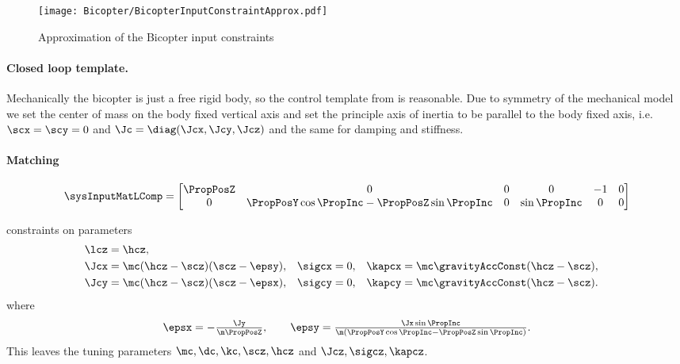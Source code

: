 \begin{figure}[ht]
 \centering
 \texttt{[image: Bicopter/BicopterInputConstraintApprox.pdf]}
 \caption{Approximation of the Bicopter input constraints}
 \label{fig:BicopterInputConstraintApprox}
\end{figure}


\paragraph{Closed loop template.}
Mechanically the bicopter is just a free rigid body, so the control template from  is reasonable.
Due to symmetry of the mechanical model we set the center of mass on the body fixed vertical axis and set the principle axis of inertia to be parallel to the body fixed axis, i.e.\ $\scx=\scy=0$ and $\Jc=\diag(\Jcx, \Jcy, \Jcz)$ and the same for damping and stiffness.

\paragraph{Matching}
\begin{align}
 \sysInputMatLComp = \begin{bmatrix} \PropPosZ & 0 & 0 & 0 & -1 & 0 \\ 0 & \PropPosY\cos\PropInc-\PropPosZ\sin\PropInc & 0 & \sin\PropInc & 0 & 0 \end{bmatrix}
\end{align}

constraints on parameters
\begin{align} 
 \lcz &= \hcz,
\\
 \Jcx &= \mc (\hcz-\scz)(\scz-\epsy),&
 \sigcx &= 0,&
 \kapcx &= \mc \gravityAccConst (\hcz-\scz),
\\
 \Jcy &= \mc(\hcz-\scz) (\scz-\epsx),&
 \sigcy &= 0,&
 \kapcy &= \mc \gravityAccConst (\hcz-\scz).
\end{align}
where
\begin{align}
 \epsx = -\tfrac{\Jy}{\m \PropPosZ},
\qquad
 \epsy = \tfrac{\Jx \sin\PropInc}{\m (\PropPosY \cos\PropInc - \PropPosZ \sin\PropInc)}.
\end{align}
This leaves the tuning parameters $\mc, \dc, \kc, \scz, \hcz$ and $\Jcz, \sigcz, \kapcz$.

